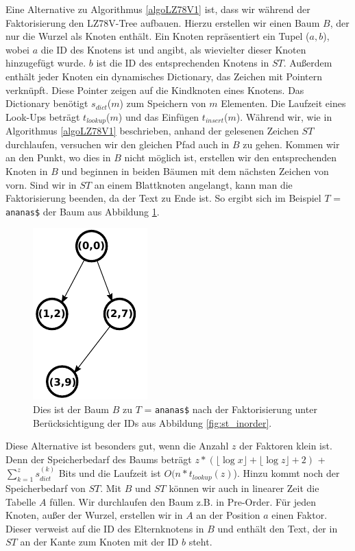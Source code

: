 \documentclass[a4paper,11pt]{scrartcl}%
\theoremstyle{change}
\theoremstyle{nonumberplain}
\theoremstyle{change}
\theoremstyle{nonumberplain}
\theoremstyle{change}
\theoremstyle{nonumberplain}
\begin{document}
		Eine Alternative zu Algorithmus \ref{algoLZ78V1} ist, dass wir während der Faktorisierung den LZ78V-Tree aufbauen. Hierzu erstellen wir einen Baum $B$, der nur die Wurzel als Knoten enthält. Ein Knoten repräsentiert ein Tupel ($a ,b$), wobei $a$ die ID des Knotens ist und angibt, als wievielter dieser Knoten hinzugefügt wurde. $b$ ist die ID des entsprechenden Knotens in $ST$. Außerdem enthält jeder Knoten ein dynamisches Dictionary, das Zeichen mit Pointern verknüpft. Diese Pointer zeigen auf die Kindknoten eines Knotens. Das Dictionary benötigt $s_{dict}$($m$) zum Speichern von $m$ Elementen. Die Laufzeit eines Look-Ups beträgt $t_{lookup}$($m$) und das Einfügen $t_{insert}$($m$). Während wir, wie in Algorithmus \ref{algoLZ78V1} beschrieben, anhand der gelesenen Zeichen $ST$ durchlaufen, versuchen wir den gleichen Pfad auch in $B$ zu gehen. Kommen wir an den Punkt, wo dies in $B$ nicht möglich ist, erstellen wir den entsprechenden Knoten in $B$ und beginnen in beiden Bäumen mit dem nächsten Zeichen von vorn. Sind wir in $ST$ an einem Blattknoten angelangt, kann man die Faktorisierung beenden, da der Text zu Ende ist. So ergibt sich im Beispiel $T$ = \texttt{ananas\$} der Baum aus Abbildung \ref{fig:ausschnitt}. 
			\begin{figure}[h]
				\centering
				\includegraphics[scale=0.8]{./pics/ananas_LZ78VTree(ausschnitt)}
				\caption{Dies ist der Baum $B$ zu $T$ = \texttt{ananas\$} nach der Faktorisierung unter Berücksichtigung der IDs aus Abbildung \ref{fig:st_inorder}.}
				\label{fig:ausschnitt}
			\end{figure}
		Diese Alternative ist besonders gut, wenn die Anzahl $z$ der Faktoren klein ist. Denn der Speicherbedarf des Baums beträgt $z * (\lfloor\log x\rfloor + \lfloor\log z\rfloor + 2)$ + $\sum_{k=1}^z s_{dict}^{(k)}$ Bits und die Laufzeit ist $O(n * t_{lookup}(z)$). Hinzu kommt noch der Speicherbedarf von $ST$.
		Mit $B$ und $ST$ können wir auch in linearer Zeit die Tabelle $A$ füllen. Wir durchlaufen den Baum z.B. in Pre-Order. Für jeden Knoten, außer der Wurzel,  erstellen wir in $A$ an der Position $a$ einen Faktor. Dieser verweist auf die ID des Elternknotens in $B$ und enthält den Text, der in $ST$ an der Kante zum Knoten mit der ID $b$ steht.
		
\end{document}

